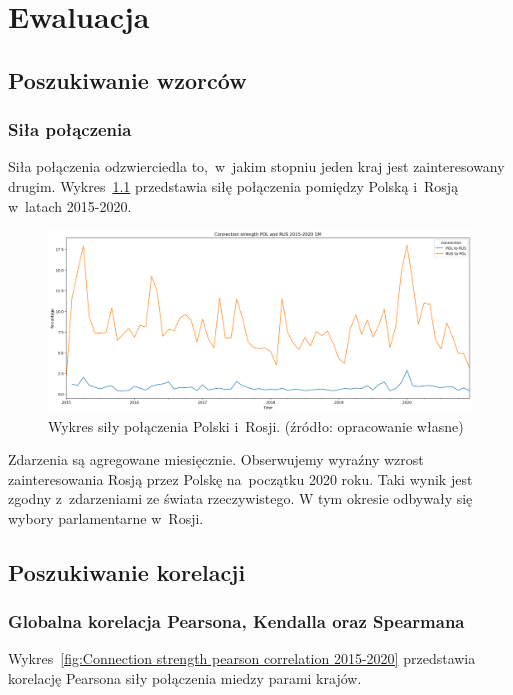 \documentclass[11pt]{report}
\begin{document}
    \chapter{Ewaluacja}\label{ch:ewaluacja}


    \section{Poszukiwanie wzorców}\label{sec:poszukiwanie-wzorców}

    \subsection{Siła połączenia}
    Siła połączenia odzwierciedla to,~w~jakim stopniu jeden kraj jest zainteresowany drugim.
    Wykres~\ref{fig:POL and RUS connection 1M} przedstawia siłę połączenia pomiędzy Polską i~Rosją w~latach 2015-2020.

    \begin{figure}[!ht]
        \centering
        \includegraphics[width=\linewidth]{../spade_proto/figures/symmetry/POL and RUSconnection 1M.png}
        \caption{Wykres siły połączenia Polski i~Rosji. (źródło: opracowanie własne)}
        \label{fig:POL and RUS connection 1M}
    \end{figure}

    Zdarzenia są agregowane miesięcznie.
    Obserwujemy wyraźny wzrost zainteresowania Rosją przez Polskę na~początku 2020 roku.
    Taki wynik jest zgodny z~zdarzeniami ze świata rzeczywistego.
    W tym okresie odbywały się wybory parlamentarne w~Rosji.


    \section{Poszukiwanie korelacji}\label{sec:poszukiwanie-korelacji}

    \subsection{Globalna korelacja Pearsona, Kendalla oraz Spearmana}
    Wykres~\ref{fig:Connection strength pearson correlation 2015-2020} przedstawia korelację Pearsona siły połączenia miedzy parami krajów.
\end{document}
